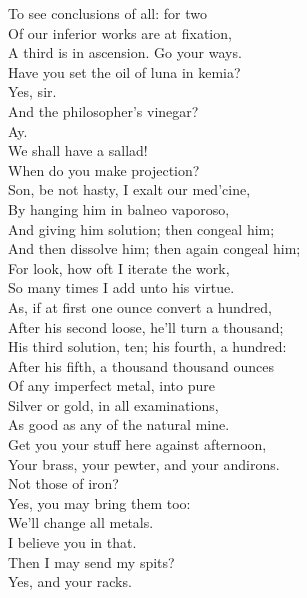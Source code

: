 \documentclass[a4paper,oneside]{memoir}
\begin{document}
\begin{drama*}
To see conclusions of all: for two\\
Of our inferior works are at fixation,\\
A third is in ascension. Go your ways.\\
Have you set the oil of luna in kemia?\\
\facespeaks Yes, sir.\\
\subtlespeaks {} And the philosopher's vinegar?\\
\facespeaks {} Ay.\\
\surlyspeaks We shall have a sallad!\\
\mammonspeaks {} When do you make projection?\\
\subtlespeaks Son, be not hasty, I exalt our med'cine,\\
By hanging him in balneo vaporoso,\\
And giving him solution; then congeal him;\\
And then dissolve him; then again congeal him;\\
For look, how oft I iterate the work,\\
So many times I add unto his virtue.\\
As, if at first one ounce convert a hundred,\\
After his second loose, he'll turn a thousand;\\
His third solution, ten; his fourth, a hundred:\\
After his fifth, a thousand thousand ounces\\
Of any imperfect metal, into pure\\
Silver or gold, in all examinations,\\
As good as any of the natural mine.\\
Get you your stuff here against afternoon,\\
Your brass, your pewter, and your andirons.\\
\mammonspeaks Not those of iron?\\
\subtlespeaks {} Yes, you may bring them too:\\
We'll change all metals.\\
\surlyspeaks {} I believe you in that.\\
\mammonspeaks Then I may send my spits?\\
\subtlespeaks {} Yes, and your racks.\\

\end{drama*}
\end{document}
